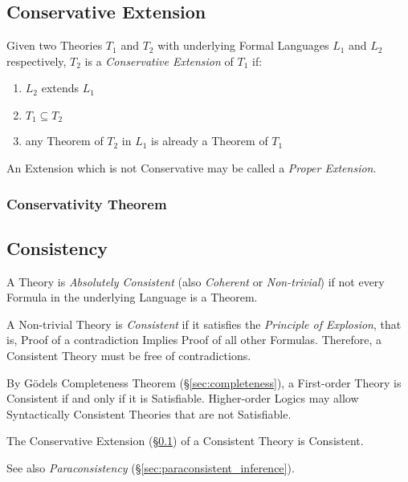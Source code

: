 \subsection{Conservative Extension}\label{sec:conservative_extension}

Given two Theories $T_1$ and $T_2$ with underlying Formal Languages
$L_1$ and $L_2$ respectively, $T_2$ is a \emph{Conservative Extension}
of $T_1$ if:
\begin{enumerate}
  \item $L_2$ extends $L_1$
  \item $T_1 \subseteq T_2$
  \item any Theorem of $T_2$ in $L_1$ is already a Theorem of $T_1$
\end{enumerate}
An Extension which is not Conservative may be called a \emph{Proper
  Extension}.



\subsubsection{Conservativity Theorem}\label{sec:conservativity_theorem}



\subsection{Consistency}\label{sec:consistency}

A Theory is \emph{Absolutely Consistent} (also \emph{Coherent} or
\emph{Non-trivial}) if not every Formula in the underlying Language is
a Theorem.

A Non-trivial Theory is \emph{Consistent} if it satisfies the
\emph{Principle of Explosion}, that is, Proof of a contradiction
Implies Proof of all other Formulas. Therefore, a Consistent Theory must
be free of contradictions.

By G\"odels Completeness Theorem (\S\ref{sec:completeness}), a
First-order Theory is Consistent if and only if it is Satisfiable.
Higher-order Logics may allow Syntactically Consistent Theories that
are not Satisfiable.

The Conservative Extension (\S\ref{sec:conservative_extension}) of a
Consistent Theory is Consistent.

See also \emph{Paraconsistency} (\S\ref{sec:paraconsistent_inference}).



